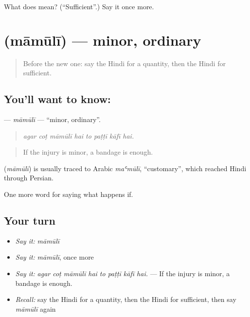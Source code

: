 \begin{tcolorbox}[breakable,colback=teal!4,colframe=teal!35!black,title={Before you move on}]
What does  mean? (\textquotedblleft{}Sufficient\textquotedblright{}.) Say it once more.
\end{tcolorbox}
\section[\texorpdfstring{\hi{मामूली} (māmūlī)}{मामूली (māmūlī)}]{ (māmūlī) — minor, ordinary}

\label{lesson:HI-C388-mamuli}



\begin{quote}
Before the new one: say the Hindi for a quantity, then the Hindi for sufficient.
\end{quote}

\subsection*{You'll want to know: }
\textbf{} — \emph{māmūlī} — \textquotedblleft{}minor, ordinary\textquotedblright{}.

\begin{quote}
       
\end{quote}

\begin{quote}
\emph{agar coṭ māmūlī hai to paṭṭī kāfī hai.}
\end{quote}

\begin{quote}
If the injury is minor, a bandage is enough.
\end{quote}

\begin{cousinweb}
\textbf{} (\emph{māmūlī}) is usually traced to Arabic \emph{maʿmūlī}, \textquotedblleft{}customary\textquotedblright{}, which reached Hindi through Persian.
\end{cousinweb}

\begin{grammarlens}[title={What you've built}]
One more word for saying what happens if.
\end{grammarlens}

\subsection*{Your turn}
\begin{itemize}
\raggedright
  \item \emph{Say it:} \emph{māmūlī}
  \item \emph{Say it:} \emph{māmūlī}, once more
  \item \emph{Say it:} \emph{agar coṭ māmūlī hai to paṭṭī kāfī hai.} — If the injury is minor, a bandage is enough.
  \item \emph{Recall:} say the Hindi for a quantity, then the Hindi for sufficient, then say \emph{māmūlī} again
\end{itemize}

